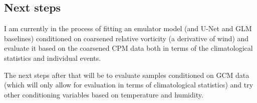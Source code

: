 \subsection{Next steps}

I am currently in the process of fitting an emulator model (and U-Net and GLM baselines) conditioned on coarsened relative vorticity (a derivative of wind) and evaluate it based on the coarsened CPM data both in terms of the climatological statistics and individual events.

The next steps after that will be to evaluate samples conditioned on GCM data (which will only allow for evaluation in terms of climatological statistics) and try other conditioning variables based on temperature and humidity.

